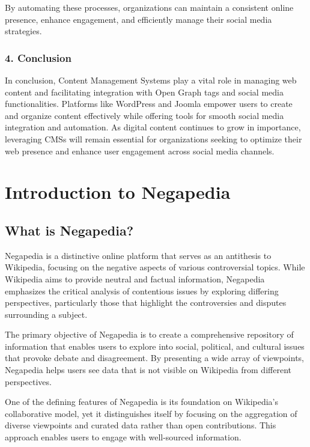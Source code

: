 By automating these processes, organizations can maintain a consistent online presence, enhance engagement, and efficiently manage their social media strategies.

\subsubsection{4. Conclusion}

In conclusion, Content Management Systems play a vital role in managing web content and facilitating integration with Open Graph tags and social media functionalities. Platforms like WordPress and Joomla empower users to create and organize content effectively while offering tools for smooth social media integration and automation. As digital content continues to grow in importance, leveraging CMSs will remain essential for organizations seeking to optimize their web presence and enhance user engagement across social media channels.

\section{Introduction to Negapedia}
\label{sec:introduction_to_negapedia}

\subsection{What is Negapedia?}
\label{subsec:what_is_negapedia}

Negapedia is a distinctive online platform that serves as an antithesis to Wikipedia, focusing on the negative aspects of various controversial topics. While Wikipedia aims to provide neutral and factual information, Negapedia emphasizes the critical analysis of contentious issues by exploring differing perspectives, particularly those that highlight the controversies and disputes surrounding a subject.

The primary objective of Negapedia is to create a comprehensive repository of information that enables users to explore into social, political, and cultural issues that provoke debate and disagreement. By presenting a wide array of viewpoints, Negapedia helps users see data that is not visible on Wikipedia from different perspectives.

One of the defining features of Negapedia is its foundation on Wikipedia's collaborative model, yet it distinguishes itself by focusing on the aggregation of diverse viewpoints and curated data rather than open contributions. This approach enables users to engage with well-sourced information.

